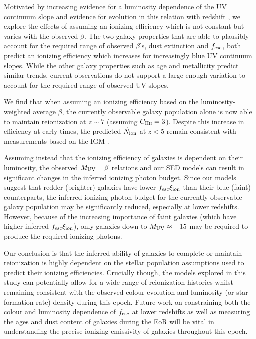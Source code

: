 Motivated by increasing evidence for a luminosity dependence of the UV continuum slope  \citep{Bouwens:2013vf,Rogers:2014bn} and evidence for evolution in this relation with redshift \citep{Bouwens:2013vf}, we explore the effects of assuming an ionizing efficiency which is not constant but varies with the observed $\beta$. The two galaxy properties that are able to plausibly account for the required range of observed $\beta$'s, dust extinction and $f_{\rm{esc}}$, both predict an ionizing efficiency which increases for increasingly blue UV continuum slopes. While the other galaxy properties such as age and metallicity predict similar trends, current observations do not support a large enough variation to account for the required range of observed UV slopes.

We find that when assuming an ionizing efficiency based on the luminosity-weighted average $\beta$, the currently observable galaxy population alone is now able to maintain reionization at $z\sim7$ (assuming $C_{\textsc{Hii}} = 3$). Despite this increase in efficiency at early times, the predicted $\dot{N}_{\rm{ion}}$ at $z < 5$ remain consistent with measurements based on the IGM \citep{Becker:2013hc}.

Assuming instead that the ionizing efficiency of galaxies is dependent on their luminosity, the observed $M_{\rm{UV}} - \beta$ relations and our SED models can result in significant changes in the inferred ionizing photon budget. Since our models suggest that redder (brighter) galaxies have lower $f_{\rm{esc}}\xi_{\rm{ion}}$ than their blue (faint) counterparts, the inferred ionizing photon budget for the currently observable galaxy population may be significantly reduced, especially at lower redshifts. However, because of the increasing importance of faint galaxies (which have higher inferred $f_{\rm{esc}}\xi_{\rm{ion}}$), only galaxies down to $M_{\rm{UV}} \approx -15$ may be required to produce the required ionizing photons.

Our conclusion is that the inferred ability of galaxies to complete or maintain reionization is highly dependent on the stellar population assumptions used to predict their ionizing efficiencies. Crucially though, the models explored in this study can potentially allow for a wide range of reionization histories whilst remaining consistent with the observed colour evolution and luminosity (or star-formation rate) density during this epoch. Future work on constraining both the colour and luminosity dependence of $f_{\rm{esc}}$ at lower redshifts as well as measuring the ages and dust content of galaxies during the EoR will be vital in understanding the precise ionizing emissivity of galaxies throughout this epoch.
